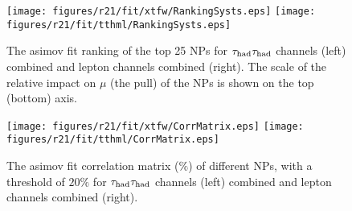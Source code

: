 \begin{figure}[htb]
\centering
\texttt{[image: figures/r21/fit/xtfw/RankingSysts.eps]}
\texttt{[image: figures/r21/fit/tthml/RankingSysts.eps]}
\caption{ The asimov fit ranking of the top 25 NPs for $\tau_\text{had}{}\tau_\text{had}$ channels (left) combined and lepton channels combined (right). The scale of the relative impact on $\mu$ (the pull) of the NPs is shown on the top (bottom) axis.}
\label{fig:fcnc_rank_data}
\end{figure}

\begin{figure}[htb]
\centering
\texttt{[image: figures/r21/fit/xtfw/CorrMatrix.eps]}
\texttt{[image: figures/r21/fit/tthml/CorrMatrix.eps]}
\caption{ The asimov fit correlation matrix ($\%$) of different NPs, with a threshold of $20\%$ for $\tau_\text{had}{}\tau_\text{had}$ channels (left) combined and lepton channels combined (right). }
\label{fig:fcnc_correl_data}
\end{figure}

